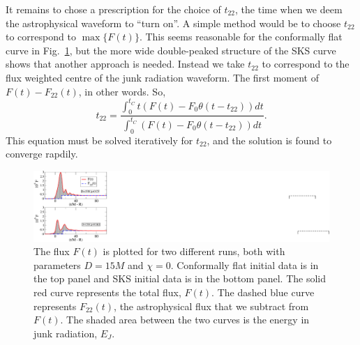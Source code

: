 It remains to chose a prescription for the choice of $t_{22}$, the
time when we deem the astrophysical waveform to ``turn on''.
A simple method would be to choose
$t_{22}$ to correspond to $\max\{F(t)\}$. This seems reasonable for
the conformally flat curve in Fig.~\ref{fig:FluxSample}, but the
more wide double-peaked structure of the SKS curve shows that another
approach is needed. Instead we take $t_{22}$ to correspond to the flux
weighted centre of the junk radiation waveform. The first moment of
$F(t)-F_{22}(t)$, in other words. So,
\begin{equation}\label{eq:t22}
t_{22}=\frac{\int_0^{t_C}{t\left(F\left(t\right)-F_0\theta\left(t-t_{22}\right)\right)dt}}{\int_0^{t_C}{\left(F\left(t\right)-F_0\theta\left(t-t_{22}\right)\right)dt}}.
\end{equation}
This equation must be solved iteratively for $t_{22}$, and the
solution is found to converge rapdily.

\begin{figure}
 \includegraphics[scale=0.95]{chap5/FluxSample}
  \caption[The flux, $F(t)$, and the computation of $E_J$ for CF and
  SKS intitial data.]{The flux $F(t)$ is plotted for two different runs, both
    with parameters $D=15M$ and $\chi=0$. Conformally flat initial
    data is in the top panel and SKS initial data is in the bottom
    panel. The solid red curve represents the total flux, $F(t)$. The
    dashed blue curve represents $F_{22}(t)$, the astrophysical flux
    that we subtract from $F(t)$. The shaded area between the two
    curves is the energy in junk radiation, $E_J$.
}
  \label{fig:FluxSample}
\end{figure}

